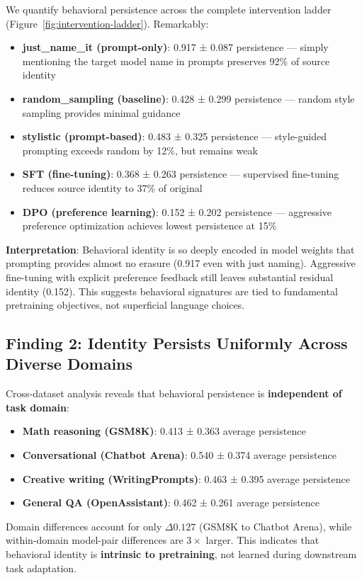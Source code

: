 \documentclass{article}
\begin{document}
We quantify behavioral persistence across the complete intervention ladder (Figure~\ref{fig:intervention-ladder}). Remarkably:
\begin{itemize}
\item \textbf{just\_name\_it (prompt-only)}: 0.917 ± 0.087 persistence — simply mentioning the target model name in prompts preserves 92\% of source identity
\item \textbf{random\_sampling (baseline)}: 0.428 ± 0.299 persistence — random style sampling provides minimal guidance
\item \textbf{stylistic (prompt-based)}: 0.483 ± 0.325 persistence — style-guided prompting exceeds random by 12\%, but remains weak
\item \textbf{SFT (fine-tuning)}: 0.368 ± 0.263 persistence — supervised fine-tuning reduces source identity to 37\% of original
\item \textbf{DPO (preference learning)}: 0.152 ± 0.202 persistence — aggressive preference optimization achieves lowest persistence at 15\%
\end{itemize}

\textbf{Interpretation}: Behavioral identity is so deeply encoded in model weights that prompting provides almost no erasure (0.917 even with just naming). Aggressive fine-tuning with explicit preference feedback still leaves substantial residual identity (0.152). This suggests behavioral signatures are tied to fundamental pretraining objectives, not superficial language choices.

\subsection*{Finding 2: Identity Persists Uniformly Across Diverse Domains}

Cross-dataset analysis reveals that behavioral persistence is \textbf{independent of task domain}:
\begin{itemize}
\item \textbf{Math reasoning (GSM8K)}: 0.413 ± 0.363 average persistence
\item \textbf{Conversational (Chatbot Arena)}: 0.540 ± 0.374 average persistence
\item \textbf{Creative writing (WritingPrompts)}: 0.463 ± 0.395 average persistence
\item \textbf{General QA (OpenAssistant)}: 0.462 ± 0.261 average persistence
\end{itemize}

Domain differences account for only $\Delta 0.127$ (GSM8K to Chatbot Arena), while within-domain model-pair differences are $3\times$ larger. This indicates that behavioral identity is \textbf{intrinsic to pretraining}, not learned during downstream task adaptation.
\end{document}
